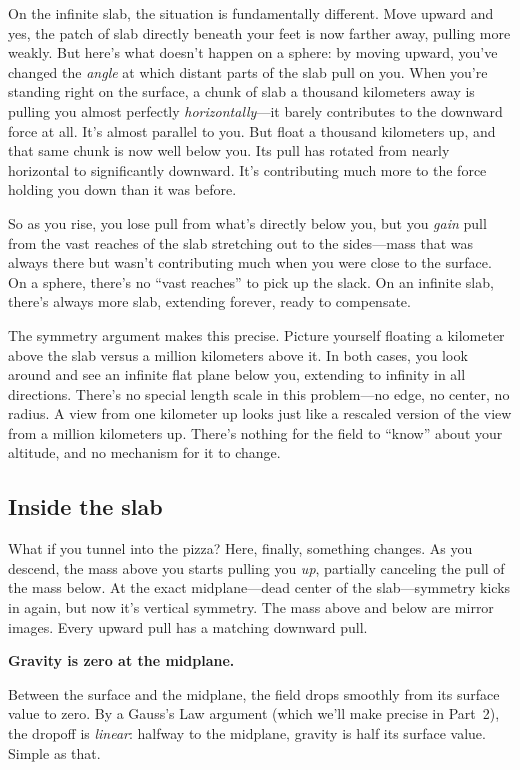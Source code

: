 \documentclass[11pt, letterpaper]{article}
\begin{document}
On the infinite slab, the situation is fundamentally different. Move upward and yes, the patch of slab directly beneath your feet is now farther away, pulling more weakly. But here's what doesn't happen on a sphere: by moving upward, you've changed the \textit{angle} at which distant parts of the slab pull on you. When you're standing right on the surface, a chunk of slab a thousand kilometers away is pulling you almost perfectly \textit{horizontally}---it barely contributes to the downward force at all. It's almost parallel to you. But float a thousand kilometers up, and that same chunk is now well below you. Its pull has rotated from nearly horizontal to significantly downward. It's contributing much more to the force holding you down than it was before.

So as you rise, you lose pull from what's directly below you, but you \textit{gain} pull from the vast reaches of the slab stretching out to the sides---mass that was always there but wasn't contributing much when you were close to the surface. On a sphere, there's no ``vast reaches'' to pick up the slack. On an infinite slab, there's always more slab, extending forever, ready to compensate.

The symmetry argument makes this precise. Picture yourself floating a kilometer above the slab versus a million kilometers above it. In both cases, you look around and see an infinite flat plane below you, extending to infinity in all directions. There's no special length scale in this problem---no edge, no center, no radius. A view from one kilometer up looks just like a rescaled version of the view from a million kilometers up. There's nothing for the field to ``know'' about your altitude, and no mechanism for it to change.

\subsection{Inside the slab}

What if you tunnel into the pizza? Here, finally, something changes. As you descend, the mass above you starts pulling you \textit{up}, partially canceling the pull of the mass below. At the exact midplane---dead center of the slab---symmetry kicks in again, but now it's vertical symmetry. The mass above and below are mirror images. Every upward pull has a matching downward pull.

\textbf{Gravity is zero at the midplane.}

Between the surface and the midplane, the field drops smoothly from its surface value to zero. By a Gauss's Law argument (which we'll make precise in Part~2), the dropoff is \textit{linear}: halfway to the midplane, gravity is half its surface value. Simple as that.
\end{document}
